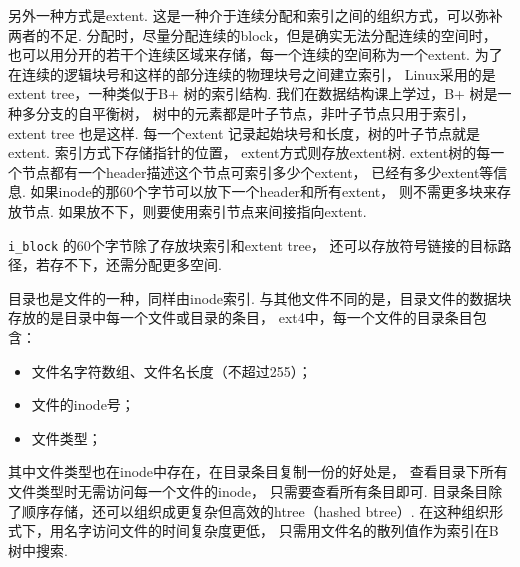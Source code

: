 另外一种方式是extent.
这是一种介于连续分配和索引之间的组织方式，可以弥补两者的不足.
分配时，尽量分配连续的block，但是确实无法分配连续的空间时，
也可以用分开的若干个连续区域来存储，每一个连续的空间称为一个extent. 
为了在连续的逻辑块号和这样的部分连续的物理块号之间建立索引，
Linux采用的是extent tree，一种类似于B+ 树的索引结构.
我们在数据结构课上学过，B+ 树是一种多分支的自平衡树，
树中的元素都是叶子节点，非叶子节点只用于索引，
extent tree 也是这样.
每一个extent 记录起始块号和长度，树的叶子节点就是extent.
索引方式下存储指针的位置，
extent方式则存放extent树.
extent树的每一个节点都有一个header描述这个节点可索引多少个extent，
已经有多少extent等信息.
如果inode的那60个字节可以放下一个header和所有extent，
则不需更多块来存放节点.
如果放不下，则要使用索引节点来间接指向extent.\cite{Ext4Extent}

\lstinline{i_block} 的60个字节除了存放块索引和extent tree，
还可以存放符号链接的目标路径，若存不下，还需分配更多空间.

目录也是文件的一种，同样由inode索引.
与其他文件不同的是，目录文件的数据块存放的是目录中每一个文件或目录的条目，
ext4中，每一个文件的目录条目包含：
\begin{itemize}
	\item 文件名字符数组、文件名长度（不超过255）；
	\item 文件的inode号；
	\item 文件类型；
\end{itemize}
其中文件类型也在inode中存在，在目录条目复制一份的好处是，
查看目录下所有文件类型时无需访问每一个文件的inode，
只需要查看所有条目即可.\cite{ext4dynamic}
目录条目除了顺序存储，还可以组织成更复杂但高效的htree（hashed btree）. 
在这种组织形式下，用名字访问文件的时间复杂度更低，
只需用文件名的散列值作为索引在B树中搜索.


